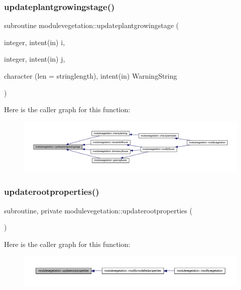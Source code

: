 \subsubsection{\texorpdfstring{updateplantgrowingstage()}{updateplantgrowingstage()}}
{\footnotesize\ttfamily subroutine modulevegetation\+::updateplantgrowingstage (\begin{DoxyParamCaption}\item[{integer, intent(in)}]{i,  }\item[{integer, intent(in)}]{j,  }\item[{character (len = stringlength), intent(in)}]{Warning\+String }\end{DoxyParamCaption})\hspace{0.3cm}{\ttfamily [private]}}

Here is the caller graph for this function\+:\nopagebreak
\begin{figure}[H]
\begin{center}
\leavevmode
\includegraphics[width=350pt]{namespacemodulevegetation_a8f770924e5053c42aa7f57b5a6f5be05_icgraph}
\end{center}
\end{figure}
\mbox{\label{namespacemodulevegetation_a508cd23535bbe150f1712dc11c562d65}} 
\subsubsection{\texorpdfstring{updaterootproperties()}{updaterootproperties()}}
{\footnotesize\ttfamily subroutine, private modulevegetation\+::updaterootproperties (\begin{DoxyParamCaption}{ }\end{DoxyParamCaption})\hspace{0.3cm}{\ttfamily [private]}}

Here is the caller graph for this function\+:\nopagebreak
\begin{figure}[H]
\begin{center}
\leavevmode
\includegraphics[width=350pt]{namespacemodulevegetation_a508cd23535bbe150f1712dc11c562d65_icgraph}
\end{center}
\end{figure}
\mbox{\label{namespacemodulevegetation_ac544594c050d3fcb7a12971817350194}} 
